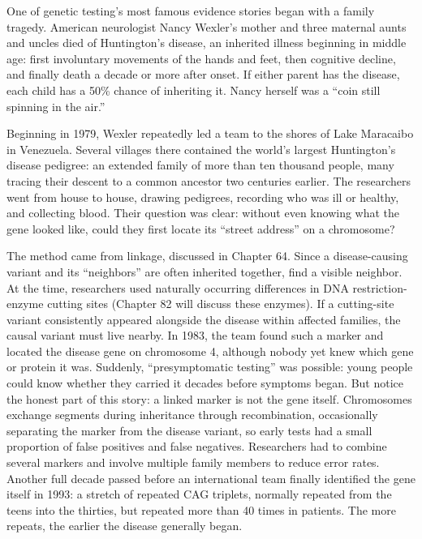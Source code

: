 \begin{zhengju}
One of genetic testing's most famous evidence stories began with a family tragedy. American neurologist Nancy Wexler's mother and three maternal aunts and uncles died of Huntington's disease, an inherited illness beginning in middle age: first involuntary movements of the hands and feet, then cognitive decline, and finally death a decade or more after onset. If either parent has the disease, each child has a 50\% chance of inheriting it. Nancy herself was a ``coin still spinning in the air.''

Beginning in 1979, Wexler repeatedly led a team to the shores of Lake Maracaibo in Venezuela. Several villages there contained the world's largest Huntington's disease pedigree: an extended family of more than ten thousand people, many tracing their descent to a common ancestor two centuries earlier. The researchers went from house to house, drawing pedigrees, recording who was ill or healthy, and collecting blood. Their question was clear: without even knowing what the gene looked like, could they first locate its ``street address'' on a chromosome?

The method came from linkage, discussed in Chapter 64. Since a disease-causing variant and its ``neighbors'' are often inherited together, find a visible neighbor. At the time, researchers used naturally occurring differences in DNA restriction-enzyme cutting sites (Chapter 82 will discuss these enzymes). If a cutting-site variant consistently appeared alongside the disease within affected families, the causal variant must live nearby. In 1983, the team found such a marker and located the disease gene on chromosome 4, although nobody yet knew which gene or protein it was. Suddenly, ``presymptomatic testing'' was possible: young people could know whether they carried it decades before symptoms began. But notice the honest part of this story: a linked marker is not the gene itself. Chromosomes exchange segments during inheritance through recombination, occasionally separating the marker from the disease variant, so early tests had a small proportion of false positives and false negatives. Researchers had to combine several markers and involve multiple family members to reduce error rates. Another full decade passed before an international team finally identified the gene itself in 1993: a stretch of repeated CAG triplets, normally repeated from the teens into the thirties, but repeated more than 40 times in patients. The more repeats, the earlier the disease generally began.


\end{zhengju}
